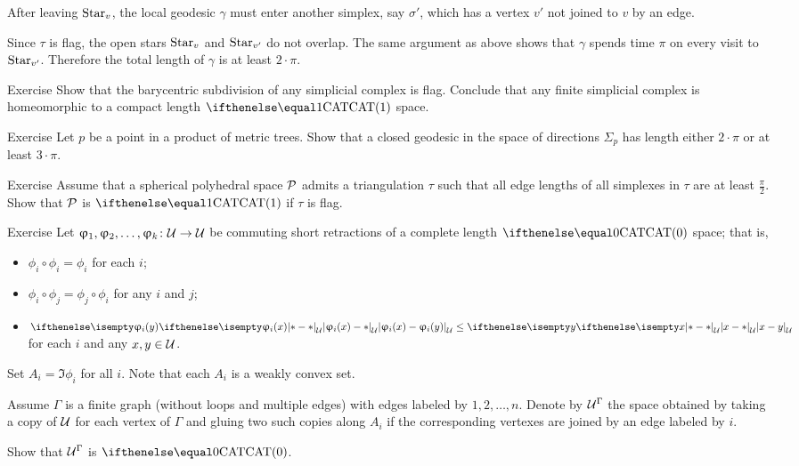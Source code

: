 After leaving $\mathop{\rm Star}\nolimits_v$,
the local geodesic $\gamma$ must enter another simplex, 
say $\sigma'$, 
which has a vertex $v'$ not joined to $v$ by an edge.

Since $\tau$ is flag, the open  stars $\mathop{\rm Star}\nolimits_v$ and $\mathop{\rm Star}\nolimits_{v'}$
do not overlap.
The same argument as above shows that $\gamma$ spends time $\pi$ on every visit to $\mathop{\rm Star}\nolimits_{v'}$.
Therefore the total length of $\gamma$ is at least $2\cdot\pi$.
\qeds

\begin{thm}{Exercise}\label{ex:barycenric-flag}
Show that the barycentric subdivision of any simplicial complex is flag.
Conclude that any finite  simplicial complex is homeomorphic to a compact length $\CAT1$ space.
\end{thm}

\begin{thm}{Exercise}\label{ex:tree-product}
Let $p$ be a point in a product of metric trees.
Show that a closed geodesic in the space of directions $\Sigma_p$ has length either $2\cdot\pi$ or at least $3\cdot\pi$.
\end{thm}


\begin{thm}{Exercise}\label{ex:obtuce-flag}
Assume that a spherical polyhedral space $\mathcal{P}$
admits a triangulation $\tau$ such that all edge lengths of all simplexes in $\tau$ are at least $\tfrac\pi2$.
Show that $\mathcal{P}$ is $\CAT{1}$
if $\tau$ is flag.
\end{thm}

\begin{thm}{Exercise}\label{ex:short+commuting}
Let $\phi_1,\phi_2,\dots,\phi_k\:\spc{U}\to \spc{U}$ be commuting short retractions of
a complete length $\CAT0$ space; 
that is, 
\begin{itemize}
\item $\phi_i\circ\phi_i=\phi_i$ for each $i$;
\item $\phi_i\circ\phi_j=\phi_j\circ\phi_i$ for any $i$ and $j$;
\item $\dist{\phi_i(x)}{\phi_i(y)}{\spc{U}}\le \dist{x}{y}{\spc{U}}$ for each $i$ and any $x,y\in\spc{U}$.
\end{itemize}
Set $A_i=\Im \phi_i$ for all $i$.
Note that each $A_i$ is a weakly convex set.

Assume $\Gamma$ is a finite graph 
(without loops and multiple edges) 
with edges labeled by $1,2,\dots, n$.
Denote by $\mathcal{U}^\Gamma$ the space obtained by taking 
a copy of $\mathcal{U}$ for each vertex of $\Gamma$ and 
gluing two such copies along $A_i$ if the corresponding vertexes are joined by an edge labeled by $i$.

Show that $\mathcal{U}^\Gamma$ is $\CAT0$.
\end{thm}

